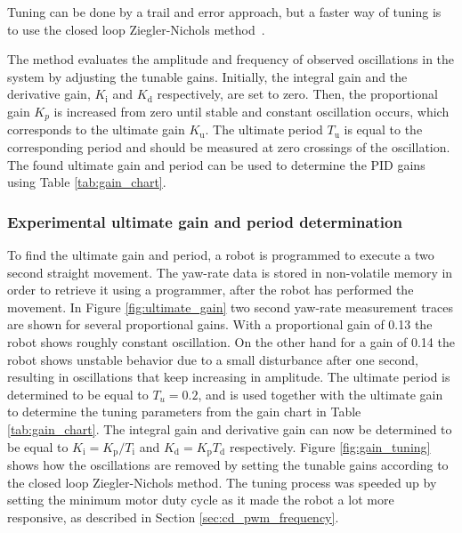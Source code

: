 Tuning can be done by a trail and error approach, but a faster way of tuning is to use the closed loop Ziegler-Nichols method~\cite{franklin_feedback_2015}.

The method evaluates the amplitude and frequency of observed oscillations in the system by adjusting the tunable gains.
Initially, the integral gain and the derivative gain, $K_{\text{i}}$ and $K_{\text{d}}$ respectively, are set to zero.
Then, the proportional gain $K_{p}$ is increased from zero until stable and constant oscillation occurs, which corresponds to the ultimate gain $K_{\text{u}}$.
The ultimate period $T_{\text{u}}$ is equal to the corresponding period and should be measured at zero crossings of the oscillation.
The found ultimate gain and period can be used to determine the PID gains using Table \ref{tab:gain_chart}.

\subsubsection{Experimental ultimate gain and period determination}	

To find the ultimate gain and period, a robot is programmed to execute a two second straight movement.
The yaw-rate data is stored in non-volatile memory in order to retrieve it using a programmer, after the robot has performed the movement.
In Figure \ref{fig:ultimate_gain} two second yaw-rate measurement traces are shown for several proportional gains.
With a proportional gain of 0.13 the robot shows roughly constant oscillation.
On the other hand for a gain of 0.14 the robot shows unstable behavior due to a small disturbance after one second, resulting in oscillations that keep increasing in amplitude.
The ultimate period is determined to be equal to $T_{u} = 0.2$, and is used together with the ultimate gain to determine the tuning parameters from the gain chart in Table \ref{tab:gain_chart}.
The integral gain and derivative gain can now be determined to be equal to $K_{\text{i}} = K_{\text{p}} / T_{\text{i}}$ and $K_{\text{d}}  = K_{\text{p}}T_{\text{d}}$ respectively.
Figure \ref{fig:gain_tuning} shows how the oscillations are removed by setting the tunable gains according to the closed loop Ziegler-Nichols method.
The tuning process was speeded up by setting the minimum motor duty cycle as it made the robot a lot more responsive, as described in Section \ref{sec:cd_pwm_frequency}.

